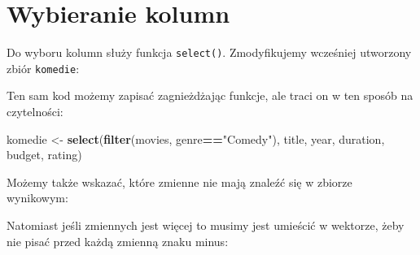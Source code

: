 \documentclass[]{book}
\newenvironment{Shaded}{\begin{snugshade}}{\end{snugshade}}
\newcommand{\KeywordTok}[1]{\textcolor[rgb]{0.13,0.29,0.53}{\textbf{#1}}}
\newcommand{\StringTok}[1]{\textcolor[rgb]{0.31,0.60,0.02}{#1}}
\newcommand{\OperatorTok}[1]{\textcolor[rgb]{0.81,0.36,0.00}{\textbf{#1}}}
\newcommand{\NormalTok}[1]{#1}
\begin{document}
\section{Wybieranie kolumn}\label{wybieranie-kolumn}

Do wyboru kolumn służy funkcja \texttt{select()}. Zmodyfikujemy
wcześniej utworzony zbiór \texttt{komedie}:

\begin{Shaded}
\end{Shaded}

Ten sam kod możemy zapisać zagnieżdżając funkcje, ale traci on w ten
sposób na czytelności:

\begin{Shaded}
\begin{Highlighting}[]
\NormalTok{komedie <-}\StringTok{ }\KeywordTok{select}\NormalTok{(}\KeywordTok{filter}\NormalTok{(movies, genre}\OperatorTok{==}\StringTok{"Comedy"}\NormalTok{), title, year, duration, budget, rating)}
\end{Highlighting}
\end{Shaded}

Możemy także wskazać, które zmienne nie mają znaleźć się w zbiorze
wynikowym:

\begin{Shaded}
\end{Shaded}

Natomiast jeśli zmiennych jest więcej to musimy jest umieścić w
wektorze, żeby nie pisać przed każdą zmienną znaku minus:

\begin{Shaded}
\end{Shaded}
\end{document}
